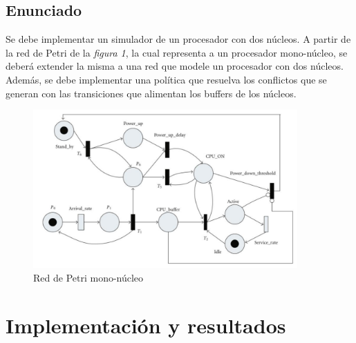 \documentclass{article}
\begin{document}
    \subsection{Enunciado}
    Se debe implementar un simulador de un procesador con dos núcleos. A partir de la red de
    Petri de la \emph{figura 1}, la cual representa a un procesador mono-núcleo, se deberá 
    extender la misma a una red que modele un procesador con dos núcleos. Además, se debe
    implementar una política que resuelva los conflictos que se generan con las transiciones
    que alimentan los buffers de los núcleos.
    \begin{figure}[H]
        \includegraphics[width=0.9\textwidth, center]{rdp_enun.png}
        \caption{Red de Petri mono-núcleo}
    \end{figure} 
    \newpage
    \section{Implementación y resultados}
\end{document}
